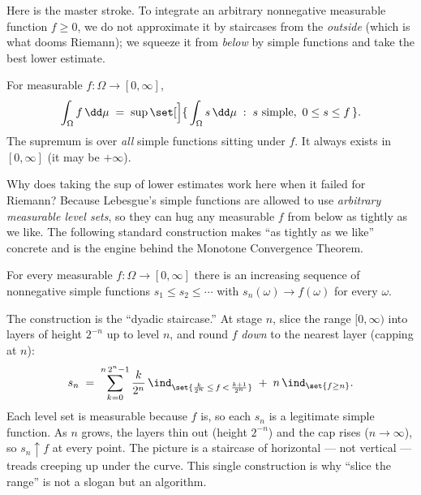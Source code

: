 Here is the master stroke. To integrate an arbitrary nonnegative measurable
function $f\ge 0$, we do not approximate it by staircases from the
\emph{outside} (which is what dooms Riemann); we squeeze it from \emph{below} by
simple functions and take the best lower estimate.

\begin{definition}
\label{ch37:def-int-nonneg}
For measurable $f\colon\Omega\to[0,\infty]$,
\[
  \int_\Omega f \,\dd\mu \;=\; \sup\set[\Big]{\, \int_\Omega s\,\dd\mu \;:\; s
  \text{ simple},\ 0 \le s \le f \,}.
\]
The supremum is over \emph{all} simple functions sitting under $f$. It always
exists in $[0,\infty]$ (it may be $+\infty$).
\end{definition}

Why does taking the sup of lower estimates work here when it failed for Riemann?
Because Lebesgue's simple functions are allowed to use \emph{arbitrary
measurable level sets}, so they can hug any measurable $f$ from below as tightly
as we like. The following standard construction makes ``as tightly as we like''
concrete and is the engine behind the Monotone Convergence Theorem.

\begin{theorem}
\label{ch37:thm-approx}
For every measurable $f\colon\Omega\to[0,\infty]$ there is an increasing
sequence of nonnegative simple functions $s_1\le s_2\le \cdots$ with
$s_n(\omega)\to f(\omega)$ for every $\omega$.
\end{theorem}

\begin{whybox}
The construction is the ``dyadic staircase.'' At stage $n$, slice the range
$[0,\infty)$ into layers of height $2^{-n}$ up to level $n$, and round $f$
\emph{down} to the nearest layer (capping at $n$):
\[
  s_n \;=\; \sum_{k=0}^{n\,2^n-1} \frac{k}{2^n}\,
  \ind_{\set{\frac{k}{2^n}\,\le\, f\,<\,\frac{k+1}{2^n}}}
  \;+\; n\,\ind_{\set{f\ge n}}.
\]
Each level set is measurable because $f$ is, so each $s_n$ is a legitimate
simple function. As $n$ grows, the layers thin out (height $2^{-n}$) and the cap
rises ($n\to\infty$), so $s_n\uparrow f$ at every point. The picture is a
staircase of horizontal --- not vertical --- treads creeping up under the curve.
This single construction is why ``slice the range'' is not a slogan but an
algorithm.
\end{whybox}

